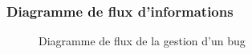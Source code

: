 \documentclass{article}[12pt]
\begin{document}
\subsubsection{Diagramme de flux d'informations}
\begin{figure}[H]
	\centering
	\caption{Diagramme de flux de la gestion d'un bug}
\end{figure}
\end{document}

